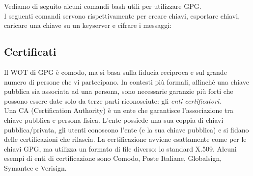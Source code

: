 Vediamo di seguito alcuni comandi bash utili per utilizzare GPG.\\
I seguenti comandi servono rispettivamente per creare chiavi, esportare chiavi, caricare una chiave su un keyserver e cifrare i messaggi:

\subsection{Certificati}
Il WOT di GPG è comodo, ma si basa sulla fiducia reciproca e sul grande numero di persone che vi partecipano. In contesti più formali, affinché una chiave pubblica sia associata ad una persona, sono necessarie garanzie più forti che possono essere date solo da terze parti riconosciute: gli \textit{enti certificatori}.\\

Una CA (Certification Authority) è un ente che garantisce l'associazione tra chiave pubblica e persona fisica. L'ente possiede una sua coppia di chiavi pubblica/privata, gli utenti conoscono l'ente (e la sua chiave pubblica) e si fidano delle certificazioni che rilascia. La certificazione avviene esattamente come per le chiavi GPG, ma utilizza un formato di file diverso: lo standard \textsf{X.509}. Alcuni esempi di enti di certificazione sono Comodo, Poste Italiane, Globalsign, Symantec e Verisign.

